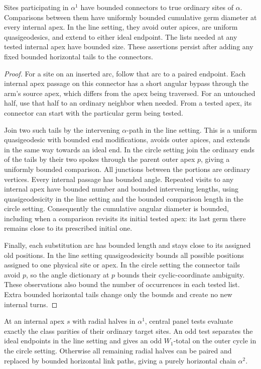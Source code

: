 \begin{lemma}\label{boundary:regular-comparisons}
Sites participating in $\alpha^1$ have bounded connectors to true ordinary
sites of $\alpha$. Comparisons between them have uniformly bounded
cumulative germ diameter at every internal apex. In the line setting,
they avoid outer apices, are uniform quasigeodesics, and extend to either
ideal endpoint. The lists needed at any tested internal apex have bounded
size. These assertions persist after adding any fixed bounded horizontal
tails to the connectors.
\end{lemma}

\begin{proof}
For a site on an inserted arc, follow that arc to a paired endpoint. Each
internal apex passage on this connector has a short angular bypass through
the arm's source apex, which differs from the apex being traversed. For an
untouched half, use that half to an ordinary neighbor when needed. From a
tested apex, its connector can start with the particular germ being tested.

Join two such tails by the intervening $\alpha$-path in the line setting.
This is a uniform quasigeodesic with bounded end modifications, avoids
outer apices, and extends in the same way towards an ideal end. In the
circle setting join the ordinary ends of the tails by their two spokes
through the parent outer apex $p$, giving a uniformly bounded comparison.
All junctions between the portions are ordinary vertices. Every internal
passage has bounded angle. Repeated visits to any internal apex have
bounded number and bounded intervening lengths, using quasigeodesicity in
the line setting and the bounded comparison length in the circle setting.
Consequently the cumulative angular diameter is bounded, including when a
comparison revisits its initial tested apex: its last germ there remains
close to its prescribed initial one.

Finally, each substitution arc has bounded length and stays close to its
assigned old positions. In the line setting quasigeodesicity bounds all
possible positions assigned to one physical site or apex. In the circle
setting the connector tails avoid $p$, so the angle dictionary at $p$
bounds their cyclic-coordinate ambiguity. These observations also bound
the number of occurrences in each tested list. Extra bounded horizontal
tails change only the bounds and create no new internal turns.
\end{proof}

\begin{lemma}\label{boundary:central-test}
At an internal apex $s$ with radial halves in $\alpha^1$, central panel
tests evaluate exactly the class parities of their ordinary target sites.
An odd test separates the ideal endpoints in the line setting and gives
an odd $W_1$-total on the outer cycle in the circle setting. Otherwise all
remaining radial halves can be paired and replaced by bounded horizontal
link paths, giving a purely horizontal chain $\alpha^2$.
\end{lemma}

